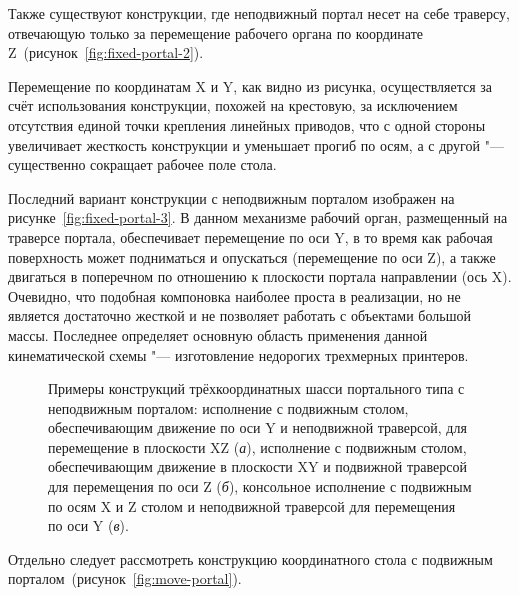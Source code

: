 Также существуют конструкции, где неподвижный портал несет на себе траверсу, отвечающую только за перемещение рабочего органа по координате Z~(рисунок~\cref{fig:fixed-portal-2}).

Перемещение по координатам X и Y, как видно из рисунка, осуществляется за счёт использования конструкции, похожей на крестовую, за исключением отсутствия единой точки крепления линейных приводов, что с одной стороны увеличивает жесткость конструкции и уменьшает прогиб по осям, а с другой "--- существенно сокращает рабочее поле стола.

Последний вариант конструкции с неподвижным порталом изображен на рисунке~\cref{fig:fixed-portal-3}. В данном механизме рабочий орган, размещенный на траверсе портала, обеспечивает перемещение по оси Y, в то время как рабочая поверхность может подниматься и опускаться (перемещение по оси Z), а также двигаться в поперечном по отношению к плоскости портала направлении (ось X). Очевидно, что подобная компоновка наиболее проста в реализации, но не является достаточно жесткой и не позволяет работать с объектами большой массы. Последнее определяет основную область применения данной кинематической схемы "--- изготовление недорогих трехмерных принтеров.

\begin{figure}[ht]
	\caption[Примеры конструкций трёхкоординатных шасси портального типа с неподвижным порталом]%
	{Примеры конструкций трёхкоординатных шасси портального типа с неподвижным порталом: исполнение с подвижным столом, обеспечивающим движение по оси Y и неподвижной траверсой, для перемещение в плоскости XZ (\textit{а}), исполнение с подвижным столом, обеспечивающим движение в плоскости XY и подвижной траверсой для перемещения по оси Z  (\textit{б}), консольное исполнение с подвижным по осям X и Z столом и неподвижной траверсой для перемещения по оси Y (\textit{в}).}\label{fig:fixed-portal}
\end{figure}

Отдельно следует рассмотреть конструкцию координатного стола с подвижным порталом~(рисунок~\cref{fig:move-portal}).

